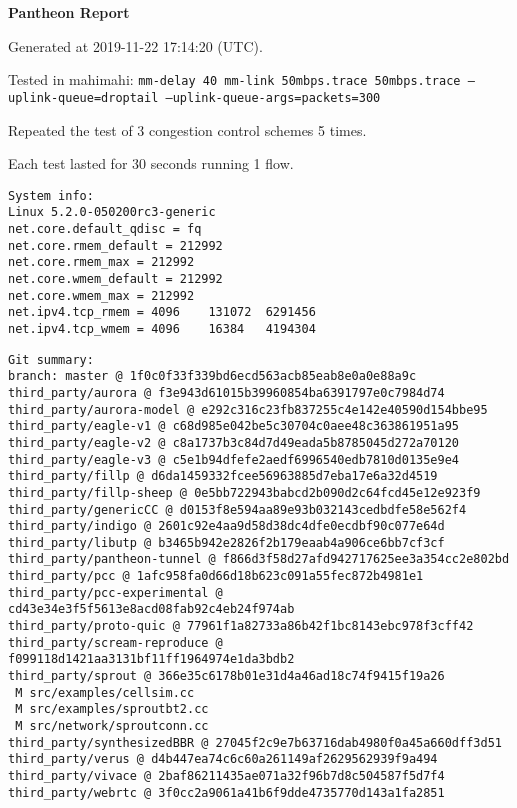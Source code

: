\documentclass{article}
\begin{document}
\centerline{\textbf{\large{Pantheon Report}}}
\vspace{20pt}

Generated at 2019-11-22 17:14:20 (UTC).

Tested in mahimahi: \texttt{mm-delay 40 mm-link 50mbps.trace 50mbps.trace --uplink-queue=droptail --uplink-queue-args=packets=300}

Repeated the test of 3 congestion control schemes 5 times.

Each test lasted for 30 seconds running 1 flow.

\begin{verbatim}
System info:
Linux 5.2.0-050200rc3-generic
net.core.default_qdisc = fq
net.core.rmem_default = 212992
net.core.rmem_max = 212992
net.core.wmem_default = 212992
net.core.wmem_max = 212992
net.ipv4.tcp_rmem = 4096	131072	6291456
net.ipv4.tcp_wmem = 4096	16384	4194304
\end{verbatim}

\begin{verbatim}
Git summary:
branch: master @ 1f0c0f33f339bd6ecd563acb85eab8e0a0e88a9c
third_party/aurora @ f3e943d61015b39960854ba6391797e0c7984d74
third_party/aurora-model @ e292c316c23fb837255c4e142e40590d154bbe95
third_party/eagle-v1 @ c68d985e042be5c30704c0aee48c363861951a95
third_party/eagle-v2 @ c8a1737b3c84d7d49eada5b8785045d272a70120
third_party/eagle-v3 @ c5e1b94dfefe2aedf6996540edb7810d0135e9e4
third_party/fillp @ d6da1459332fcee56963885d7eba17e6a32d4519
third_party/fillp-sheep @ 0e5bb722943babcd2b090d2c64fcd45e12e923f9
third_party/genericCC @ d0153f8e594aa89e93b032143cedbdfe58e562f4
third_party/indigo @ 2601c92e4aa9d58d38dc4dfe0ecdbf90c077e64d
third_party/libutp @ b3465b942e2826f2b179eaab4a906ce6bb7cf3cf
third_party/pantheon-tunnel @ f866d3f58d27afd942717625ee3a354cc2e802bd
third_party/pcc @ 1afc958fa0d66d18b623c091a55fec872b4981e1
third_party/pcc-experimental @ cd43e34e3f5f5613e8acd08fab92c4eb24f974ab
third_party/proto-quic @ 77961f1a82733a86b42f1bc8143ebc978f3cff42
third_party/scream-reproduce @ f099118d1421aa3131bf11ff1964974e1da3bdb2
third_party/sprout @ 366e35c6178b01e31d4a46ad18c74f9415f19a26
 M src/examples/cellsim.cc
 M src/examples/sproutbt2.cc
 M src/network/sproutconn.cc
third_party/synthesizedBBR @ 27045f2c9e7b63716dab4980f0a45a660dff3d51
third_party/verus @ d4b447ea74c6c60a261149af2629562939f9a494
third_party/vivace @ 2baf86211435ae071a32f96b7d8c504587f5d7f4
third_party/webrtc @ 3f0cc2a9061a41b6f9dde4735770d143a1fa2851
\end{verbatim}
\end{document}
